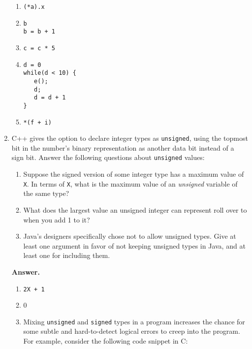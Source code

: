\documentclass[9pt]{article}
\begin{document}
\begin{enumerate}
      \begin{enumerate}
         \item \verb|(*a).x|
         \item \verb|b| \\
               \verb|b = b + 1|
         \item \verb|c = c * 5|
         \item \verb|d = 0| \\
               \verb|while(d < 10) {| \\
               \verb|   e();| \\
               \verb|   d;| \\
               \verb|   d = d + 1| \\
               \verb|}|
         \item \verb|*(f + i)|
      \end{enumerate}
   \item C++ gives the option to declare integer types as \verb|unsigned|, using
         the topmost bit in the number's binary representation as another data
         bit instead of a sign bit. Answer the following questions about
         \verb|unsigned| values:
         \begin{enumerate}
            \item Suppose the signed version of some integer type has a maximum
                  value of \verb|X|. In terms of \verb|X|, what is the maximum
                  value of an \textit{unsigned} variable of the same type?
            \item What does the largest value an unsigned integer can represent
                  roll over to when you add 1 to it?
            \item Java's designers specifically chose not to allow unsigned
                  types. Give at least one argument in favor of not keeping
                  unsigned types in Java, and at least one for including them.
         \end{enumerate}

      \textbf{Answer.}

      \begin{enumerate}
         \item \verb|2X + 1|
         \item 0
         \item Mixing \verb|unsigned| and \verb|signed| types in a program
               increases the chance for some subtle and hard-to-detect logical 
               errors to creep into the program. For example, consider the
               following code snippet in C: \\


\end{enumerate}
\end{enumerate}
\end{document}
